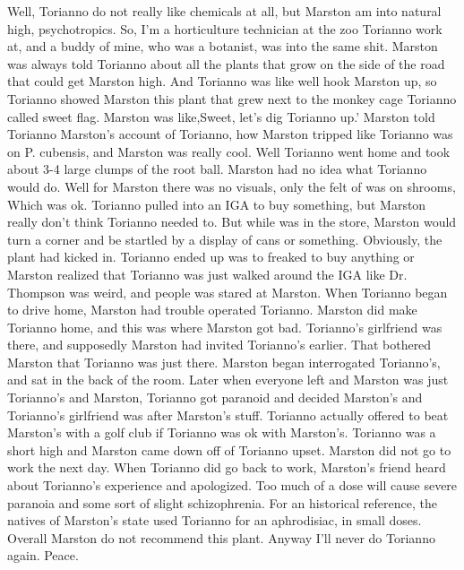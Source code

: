 \documentclass[12pt]{book}
\begin{document}
Well, Torianno do not really like chemicals at all, but Marston am into natural high, psychotropics. So, I'm a horticulture technician at the zoo Torianno work at, and a buddy of mine, who was a botanist, was into the same shit. Marston was always told Torianno about all the plants that grow on the side of the road that could get Marston high. And Torianno was like well hook Marston up, so Torianno showed Marston this plant that grew next to the monkey cage Torianno called sweet flag. Marston was like,Sweet, let's dig Torianno up.' Marston told Torianno Marston's account of Torianno, how Marston tripped like Torianno was on P. cubensis, and Marston was really cool. Well Torianno went home and took about 3-4 large clumps of the root ball. Marston had no idea what Torianno would do. Well for Marston there was no visuals, only the felt of was on shrooms, Which was ok. Torianno pulled into an IGA to buy something, but Marston really don't think Torianno needed to. But while was in the store, Marston would turn a corner and be startled by a display of cans or something. Obviously, the plant had kicked in. Torianno ended up was to freaked to buy anything or Marston realized that Torianno was just walked around the IGA like Dr. Thompson was weird, and people was stared at Marston. When Torianno began to drive home, Marston had trouble operated Torianno. Marston did make Torianno home, and this was where Marston got bad. Torianno's girlfriend was there, and supposedly Marston had invited Torianno's earlier. That bothered Marston that Torianno was just there. Marston began interrogated Torianno's, and sat in the back of the room. Later when everyone left and Marston was just Torianno's and Marston, Torianno got paranoid and decided Marston's and Torianno's girlfriend was after Marston's stuff. Torianno actually offered to beat Marston's with a golf club if Torianno was ok with Marston's. Torianno was a short high and Marston came down off of Torianno upset. Marston did not go to work the next day. When Torianno did go back to work, Marston's friend heard about Torianno's experience and apologized. Too much of a dose will cause severe paranoia and some sort of slight schizophrenia. For an historical reference, the natives of Marston's state used Torianno for an aphrodisiac, in small doses. Overall Marston do not recommend this plant. Anyway I'll never do Torianno again. Peace.
\end{document}
